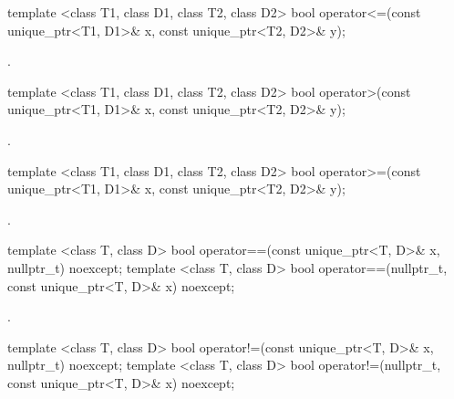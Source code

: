 %
%
\begin{itemdecl}
template <class T1, class D1, class T2, class D2>
  bool operator<=(const unique_ptr<T1, D1>& x, const unique_ptr<T2, D2>& y);
\end{itemdecl}

\begin{itemdescr}
\pnum
\returns {}.
\end{itemdescr}

%
%
\begin{itemdecl}
template <class T1, class D1, class T2, class D2>
  bool operator>(const unique_ptr<T1, D1>& x, const unique_ptr<T2, D2>& y);
\end{itemdecl}

\begin{itemdescr}
\pnum
\returns {}.
\end{itemdescr}

%
%
\begin{itemdecl}
template <class T1, class D1, class T2, class D2>
  bool operator>=(const unique_ptr<T1, D1>& x, const unique_ptr<T2, D2>& y);
\end{itemdecl}

\begin{itemdescr}
\pnum
\returns {}.
\end{itemdescr}

%
%
\begin{itemdecl}
template <class T, class D>
  bool operator==(const unique_ptr<T, D>& x, nullptr_t) noexcept;
template <class T, class D>
  bool operator==(nullptr_t, const unique_ptr<T, D>& x) noexcept;
\end{itemdecl}

\begin{itemdescr}
\pnum
\returns {}.
\end{itemdescr}

%
%
\begin{itemdecl}
template <class T, class D>
  bool operator!=(const unique_ptr<T, D>& x, nullptr_t) noexcept;
template <class T, class D>
  bool operator!=(nullptr_t, const unique_ptr<T, D>& x) noexcept;
\end{itemdecl}

